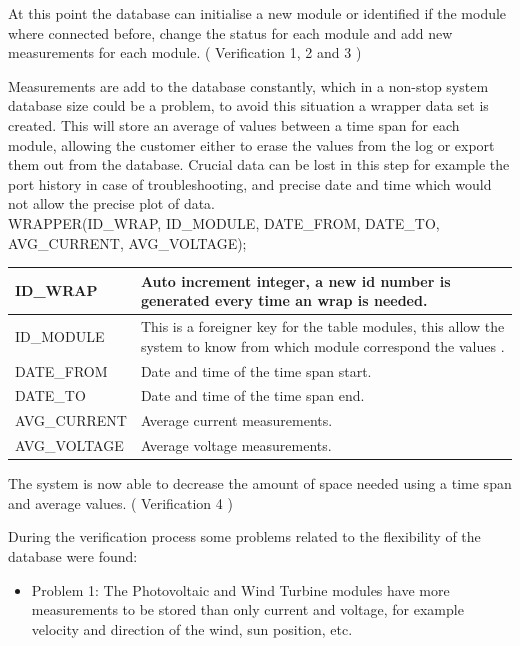 At this point the database can initialise a new module or identified if the module where connected before, change the status for each module and add new measurements for each module. ( Verification 1, 2 and 3 )

Measurements are add to the database constantly, which in a non-stop system database size could be a problem, to avoid this situation a wrapper data set is created. This will store an average of values between a time span for each module, allowing the customer either to erase the values from the log or export them out from the database. Crucial data can be lost in this step for example the port history in case of troubleshooting, and precise date and time which would not allow the precise plot of data.\\

WRAPPER(ID\_WRAP, ID\_MODULE, DATE\_FROM, DATE\_TO, AVG\_CURRENT, AVG\_VOLTAGE);

\begin{table}[H]
\centering
	\begin{tabular}{| l | p{10cm} |}
		\hline
		ID\_WRAP & Auto increment integer, a new id number is generated every time an wrap is needed. \\\hline
		ID\_MODULE & This is a foreigner key for the table modules, this allow the system to know from which module correspond the values .\\\hline
		DATE\_FROM & Date and time of the time span start. \\\hline
		DATE\_TO & Date and time of the time span end. \\\hline
		AVG\_CURRENT & Average current measurements. \\\hline
		AVG\_VOLTAGE & Average voltage measurements. \\\hline
	\end{tabular}
\end{table}

The system is now able to decrease the amount of space needed using a time span and average values. ( Verification 4 )

During the verification process some problems related to the flexibility of the database were found:
	\begin{itemize}
		\item Problem 1: The Photovoltaic and Wind Turbine modules have more measurements to be stored than only current and voltage, for example velocity and direction of the wind, sun position, etc.
 	\end{itemize}

